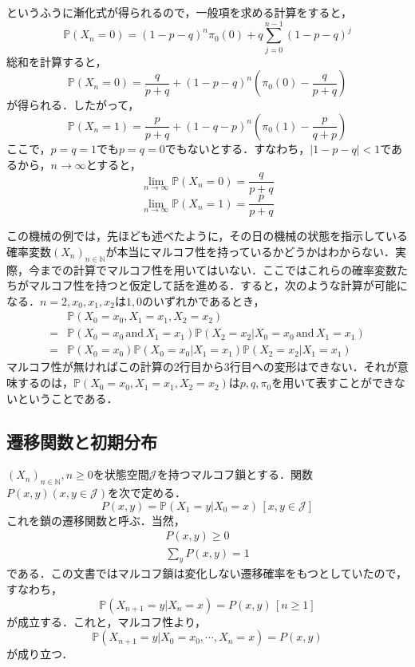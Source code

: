 \documentclass[12pt, a4paper]{jsarticle}
\theoremstyle{definition}
\newcommand{\NN}{{\mathbb{N}}} %
\begin{document}
というふうに漸化式が得られるので，一般項を求める計算をすると，
\begin{equation}
\mathbb{P}(X_n = 0) = (1-p-q)^n\pi_0(0) + q \sum_{j=0}^{n-1}(1-p-q)^j
\end{equation}
総和を計算すると，
\begin{equation}
	\mathbb{P}(X_n = 0) = \frac{q}{p+q} + (1- p- q)^{n} \left( \pi_0(0) - \frac{q}{p+ q} \right)
\end{equation}
が得られる．したがって，
\begin{equation}
	\mathbb{P}(X_n = 1) = \frac{p}{p+q} + (1- q- p)^{n} \left( \pi_0(1) - \frac{p}{q+ p} \right)
\end{equation}
ここで，$p=q=1$でも$p=q=0$でもないとする．すなわち，$|1-p-q| < 1$であるから，$n \to \infty$とすると，
\[\lim_{n \to \infty} \mathbb{P}(X_n = 0) = \frac{q}{p+q}\]
\[\lim_{n \to \infty} \mathbb{P}(X_n = 1) = \frac{p}{p+q}\]

この機械の例では，先ほども述べたように，その日の機械の状態を指示している確率変数$(X_n)_{n \in \NN}$が本当にマルコフ性を持っているかどうかはわからない．実際，今までの計算でマルコフ性を用いてはいない．ここではこれらの確率変数たちがマルコフ性を持つと仮定して話を進める．すると，次のような計算が可能になる．$n = 2,x_0,x_1,x_2$は$1,0$のいずれかであるとき，
\begin{align*}
	& \mathbb{P}(X_0 = x_0 , X_1 = x_1, X_2 = x_2) \\
	= &\mathbb{P}(X_0 = x_0\, \text{and}\, X_1 = x_1)\mathbb{P}(X_2 = x_2 | X_0 = x_0\, \text{and}\, X_1 = x_1 ) \\
	=&\mathbb{P}(X_0 = x_0)\mathbb{P}(X_0 = x_0| X_1 = x_1)\mathbb{P}(X_2 = x_2 | X_1 = x_1)
\end{align*}
マルコフ性が無ければこの計算の2行目から3行目への変形はできない．それが意味するのは，$\mathbb{P}(X_0 = x_0 , X_1 = x_1, X_2 = x_2)$は$p,q,\pi_0$を用いて表すことができないということである．

\subsection{遷移関数と初期分布}
$(X_{n})_{n \in \NN}, n \ge 0 $を状態空間$\mathcal{J}$を持つマルコフ鎖とする．関数$P(x,y) (x,y \in \mathcal{J})$を次で定める．
\begin{equation}
	P(x,y) = \mathbb{P}(X_1 = y| X_0 = x) \,[x,y \in \mathcal{J}]
\end{equation}
これを鎖の遷移関数と呼ぶ．当然，
\begin{align}
	P(x,y) \ge 0 \label{trans fcn1} \\
	\sum_y P(x,y) = 1 \label{trans fcn2}
\end{align}
である．この文書ではマルコフ鎖は変化しない遷移確率をもつとしていたので，すなわち，
\begin{equation}
	\mathbb{P}(X_{n+1} = y| X_n = x) = P(x,y) \,[n \ge 1]
\end{equation}
が成立する．これと，マルコフ性より，
\begin{equation}
	\mathbb{P}(X_{n+1} = y | X_0 = x_0 , \cdots , X_n = x) = P(x,y)	
\end{equation}
が成り立つ．
\end{document}
